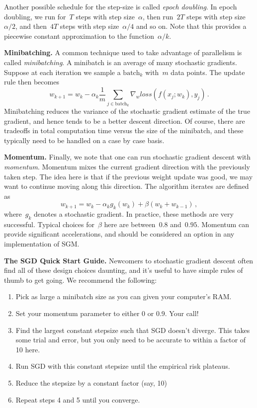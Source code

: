 \documentclass{tufte-book}
\begin{document}
Another possible schedule for the step-size is called \emph{epoch
doubling}. In epoch doubling, we run for~\(T\) steps with step
size~\(\alpha\), then run~\(2T\) steps with step size~\(\alpha/2\), and
then~\(4T\) steps with step size~\(\alpha/4\) and so on. Note that this
provides a piecewise constant approximation to the
function~\(\alpha/k\).

\textbf{Minibatching.} A common technique used to take advantage of
parallelism is called \emph{minibatching}. A minibatch is an average of
many stochastic gradients. Suppose at each iteration we sample a
\(\mathrm{batch}_k\) with~\(m\) data points. The update rule then
becomes \[
    w_{k+1} = w_{k} -\alpha_k  \frac{1}{m}\sum_{j\in \mathrm{batch}_k} \nabla_w  \mathit{loss}(f(x_j;w_k),y_j)\,.
\] Minibatching reduces the variance of the stochastic gradient estimate
of the true gradient, and hence tends to be a better descent direction.
Of course, there are tradeoffs in total computation time versus the size
of the minibatch, and these typically need to be handled on a case by
case basis.

\textbf{Momentum.} Finally, we note that one can run stochastic gradient
descent with \emph{momentum}. Momentum mixes the current gradient
direction with the previously taken step. The idea here is that if the
previous weight update was good, we may want to continue moving along
this direction. The algorithm iterates are defined as \[
w_{k+1}=w_{k}-\alpha_{k}g_k\left(w_{k}\right) + \beta (w_{k}+w_{k-1})\,,
\] where~\(g_k\) denotes a stochastic gradient. In practice, these
methods are very successful. Typical choices for~\(\beta\) here are
between~\(0.8\) and~\(0.95\). Momentum can provide significant
accelerations, and should be considered an option in any implementation
of SGM.

\textbf{The SGD Quick Start Guide.} Newcomers to stochastic gradient
descent often find all of these design choices daunting, and it's useful
to have simple rules of thumb to get going. We recommend the following:

\begin{enumerate}
\def\labelenumi{\arabic{enumi}.}
\tightlist
\item
  Pick as large a minibatch size as you can given your computer's RAM.
\item
  Set your momentum parameter to either 0 or 0.9. Your call!
\item
  Find the largest constant stepsize such that SGD doesn't diverge. This
  takes some trial and error, but you only need to be accurate to within
  a factor of 10 here.
\item
  Run SGD with this constant stepsize until the empirical risk plateaus.
\item
  Reduce the stepsize by a constant factor (say, 10)
\item
  Repeat steps 4 and 5 until you converge.
\end{enumerate}
\end{document}
